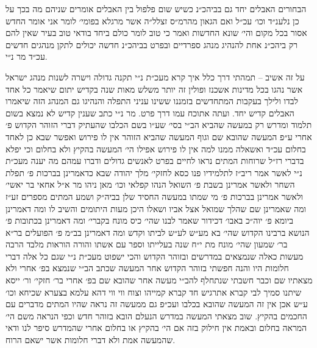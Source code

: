 \documentclass[12pt, openany]{book}
\begin{document}
\begin{multicols}{2}
הבחורים האבלים יחד גם בביהכ״נ כשיש שום פלפול בין האבלים אומרים שניהם מה בכך על כן נלענ״ד וכו׳ עכ״ל ואם הגאון מהרמ״ס זצלל״ה אשר מרגלא בפומי׳ לומר אני אומר החדש אסור בכל מקום והי׳ שונא החדשות ואמר כי טוב לומר כולם ביחד בודאי טוב בעיר שאין להם רק ביהכ״נ אחת להנהיג מנהג ספרדיים ובפרט בביהכ״נ חדשה יכולים לתקן מנהגים חדשים עכ״ד מר נ״י.\\\vspace{0pt}

על זה אשיב – תמהתי דרך כלל איך קרא מעכ״ת נ״י תקנה גדולה וישרה לשנות מנהג ישראל אשר נהגו בכל מדינות אשכנז ופולין זה יותר משלש מאות שנה בקדיש יתום שיאמר כל אחד לבדו ולילך בעקבות המתחדשים בזמננו ששינו עניני התפלה והנהיגו גם המנהג הזה שיאמרו האבלים קדיש יחד. ועתה אתוכח עמו דרך פרט. מר נ״י כתב שענין קדיש לא נמצא בשום תלמוד ומדרש רק במעשה שהביא הב״י בסי׳ שע״ו בשם הכלבו שהעתיק דברי הזוהר הקדוש פ׳ אחרי ע״פ המעשה שהובא שם וגוף המעשה שהביא הזוהר אין לו פירוש ואפשר שבא כן לאחד בחלום עכ״ד ואשאלה ממנו למה אין לו פירוש אפילו הי׳ המעשה בהקיץ ולא בחלום וכי יפלא בדברי רז״ל שרוחות המתים נראו לחיים בפרט לאנשים גדולים ודברו עמהם מה יענה מעכ״ת נ״י לאשר אמר ריב״ז לתלמידיו פנו כסא לחזקי׳ מלך יהודה שבא כדאמרינן בברכות פ׳ תפלת השחר ולאשר אמרינן בשבת פ׳ השואל הנהו קפלאי וכו׳ מאן ניהו מר א״ל אחאי בר יאשי׳ ולאשר אמרינן בברכות פ׳ מי שמתו במעשה החסיד שלן בביה״ק ושמע המתים מספרים זע״ז ומה שאמרינן שם שהלך שמואל אצל אביו ושאלו היכן מעות היתומים והשיב לו ומה דאמרינן ביומא פ׳ יוה״כ באבו׳ דכידור שאמר לבנו שהי׳ כיס מונח בקברי׳ ומה דאמרינן בכתובות פ׳ הנושא ברבינו הקדוש שהי׳ בא מע״ש לע״ש לביתו וקדש ומה דאמרינן בב״מ פ׳ הפועלים בר״א בר׳ שמעון שהי׳ מונח מת י״ח שנה בעלייתו וספר עם אשתו והורה הוראות מלבד הרבה מעשות כאלה שנמצאים במדרשים ובזוהר הקדוש והכי ישפוט מעכ״ת נ״י שגם כל אלה דברי חלומות היו והנה חפשתי בזוהר הקדוש אחר המעשה שכתב הב״י שנמצא בפ׳ אחרי ולא מצאתיו שם וכבר חשבתי שנתחלף להב״י מעשה אחר שהובא שם בפ׳ אחרי בר׳ חזקי׳ ור׳ ייסא שיתנו סמיך לבי קברא אתרגיש חד קברא קמייהו וצוח ווי ווי דהא עלמא בצערא שכיחא וכו׳ ע״ש אכן אין זה המעשה שהובא בכלבו ועכ״פ גם ממעשה זה נראה שהיו המתים מדברים עם החכמים בהקיץ. שוב מצאתי המעשה במדרש הנעלם הובא בזוהר חדש וכפי הנראה משם הי׳ המראה בחלום ובאמת אין חילוק בזה אם הי׳ בהקיץ או בחלום אחרי שהמדרש סיפר לנו ודאי שהמעשה אמת ולא דברי חלומות אשר ישאם הרוח.\\\vspace{0pt}


\end{multicols}
\end{document}
